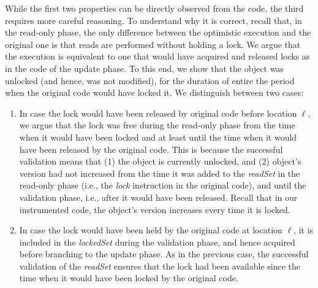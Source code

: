 While the first two properties can be directly observed from the code, the third requires more careful reasoning.
To understand why it is correct, recall that, in the read-only phase,
the only difference between the optimistic execution and the original one is that reads are performed without
holding a lock. We argue that the execution is equivalent to one that would have acquired and released
locks as in the code of the update phase. To this end, we show that the object was unlocked
(and hence, was not modified), for the duration of entire the period when the original code would have locked it.
We distinguish between two cases:
\begin{enumerate}
\item In case the lock would have been released by original code before location $\ell$,
we argue that the lock was free during the read-only phase from the time when it would have been locked
and at least until the time when it would have been released by the original code.
This is because the successful validation means that (1) the object is currently
unlocked, and (2) object's version had not increased from the time it was added to the \emph{readSet} in the read-only phase
(i.e., the \emph{lock} instruction in the original code), and until the
validation phase, i.e., after it would have
been released. Recall that in our instrumented code, the object's version increases every time it is locked.
\item In case the lock would have been held by the original code at location $\ell$, it is included in
the \emph{lockedSet} during the validation phase, and hence acquired before branching to the update phase.
As in the previous case, the successful validation of the \emph{readSet} ensures that the lock had been
available since the time when it would have been locked by the original code.
\end{enumerate}

